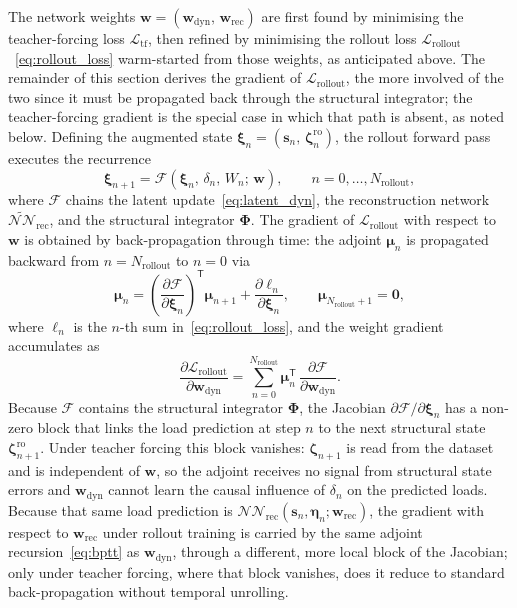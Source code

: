 The network weights $\mathbf{w} = (\mathbf{w}_\mathrm{dyn},\,\mathbf{w}_\mathrm{rec})$
are first found by minimising the teacher-forcing loss $\mathcal{L}_\mathrm{tf}$, then
refined by minimising the rollout loss $\mathcal{L}_\mathrm{rollout}$~\eqref{eq:rollout_loss}
warm-started from those weights, as anticipated above. The remainder of this section derives
the gradient of $\mathcal{L}_\mathrm{rollout}$, the more involved of the two since it must be
propagated back through the structural integrator; the teacher-forcing gradient is the special
case in which that path is absent, as noted below. Defining
the augmented state $\boldsymbol{\xi}_n = (\mathbf{s}_n,\,\boldsymbol{\zeta}_n^\mathrm{ro})$, the
rollout forward pass executes the recurrence
\begin{equation}
  \boldsymbol{\xi}_{n+1} = \mathcal{F}(\boldsymbol{\xi}_n,\,\delta_n,\,W_n;\,\mathbf{w}),
  \qquad n = 0,\ldots,N_\mathrm{rollout},
\label{eq:rollout_map}
\end{equation}
where $\mathcal{F}$ chains the latent update~\eqref{eq:latent_dyn}, the reconstruction
network $\widetilde{\mathcal{NN}}_\mathrm{rec}$, and the structural integrator $\boldsymbol{\Phi}$.
The gradient of $\mathcal{L}_\mathrm{rollout}$ with respect to $\mathbf{w}$ is obtained by
back-propagation through time: the adjoint $\boldsymbol{\mu}_n$ is propagated
backward from $n = N_\mathrm{rollout}$ to $n = 0$ via
\begin{equation}
  \boldsymbol{\mu}_{n} =
      \left(\frac{\partial \mathcal{F}}{\partial \boldsymbol{\xi}_n}\right)^\mathsf{T}
      \boldsymbol{\mu}_{n+1}
      + \frac{\partial \ell_n}{\partial \boldsymbol{\xi}_n},
  \qquad \boldsymbol{\mu}_{N_\mathrm{rollout}+1} = \mathbf{0},
\label{eq:bptt}
\end{equation}
where $\ell_n$ is the $n$-th sum in~\eqref{eq:rollout_loss}, and the weight gradient
accumulates as
\[
  \frac{\partial \mathcal{L}_\mathrm{rollout}}{\partial \mathbf{w}_\mathrm{dyn}} =
      \sum_{n=0}^{N_\mathrm{rollout}}
      \boldsymbol{\mu}_n^\mathsf{T}\,
      \frac{\partial \mathcal{F}}{\partial \mathbf{w}_\mathrm{dyn}}.
\]
Because $\mathcal{F}$ contains the structural integrator $\boldsymbol{\Phi}$, the Jacobian
$\partial\mathcal{F}/\partial\boldsymbol{\xi}_n$ has a non-zero block that links the load
prediction at step $n$ to the next structural state $\boldsymbol{\zeta}_{n+1}^\mathrm{ro}$.
Under teacher forcing this block vanishes: $\boldsymbol{\zeta}_{n+1}$ is read from the dataset
and is independent of $\mathbf{w}$, so the adjoint receives no signal from structural
state errors and $\mathbf{w}_\mathrm{dyn}$ cannot learn the causal influence of $\delta_n$
on the predicted loads. Because that same load prediction is $\mathcal{NN}_\mathrm{rec}(\mathbf{s}_n,\boldsymbol{\eta}_n;\mathbf{w}_\mathrm{rec})$, the gradient with respect to $\mathbf{w}_\mathrm{rec}$
under rollout training is carried by the same adjoint recursion~\eqref{eq:bptt} as $\mathbf{w}_\mathrm{dyn}$, through a different, more local block of the Jacobian; only under teacher forcing, where that block vanishes, does it reduce to standard back-propagation without temporal unrolling.

